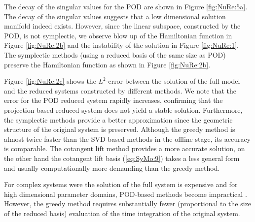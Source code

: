 \documentclass[final]{siamart}
\begin{document}
{{\color{black}} The decay of the singular values for the POD are shown in Figure \ref{fig:NuRe:5a}. The decay} of the singular values suggests that a low dimensional solution manifold indeed exists. However, since the linear subspace, constructed by the POD, is not symplectic, we observe blow up of the Hamiltonian function in Figure \ref{fig:NuRe:2b} and the instability of the solution in Figure \ref{fig:NuRe:1}. The symplectic methods (using a reduced basis of the same size as POD) preserve the Hamiltonian function as shown in Figure \ref{fig:NuRe:2b}.

Figure \ref{fig:NuRe:2c} shows the $L^2$-error between the solution of the full model and the reduced systems constructed by different methods. We note that the error for the POD reduced system rapidly increases, confirming that {{\color{black}} the} projection based reduced system does not yield a stable solution. Furthermore, the symplectic methods provide a better approximation since the geometric structure of the original system is preserved. Although the greedy method is almost {{\color{black}} twice faster than the SVD-based methods} in the offline stage, its accuracy is comparable. {{\color{black}} The cotangent lift method provides a more accurate solution, on the other hand the cotangent lift basis (\ref{eq:SyMo:9}) takes a less general form and usually computationally more demanding than the greedy method.}

{{\color{black}} For complex systems were the solution of the full system is expensive and for high dimensional parameter domains, POD-based methods become impractical \cite{Anonymous:2016wl,Quarteroni:2016wi}. However, the greedy method requires substantially fewer (proportional to the size of the reduced basis) evaluation of the time integration of the original system.}
\end{document}
